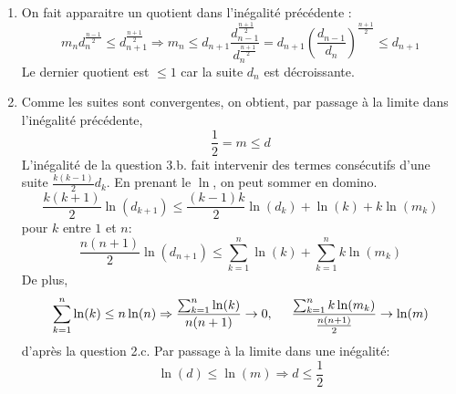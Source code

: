 \begin{enumerate}
\begin{enumerate}
\item On fait apparaitre un quotient dans l'inégalité précédente :
\begin{displaymath}
 m_n d_n^{\frac{n-1}{2}}\leq d_{n+1}^{\frac{n+1}{2}}
\Rightarrow m_n \leq d_{n+1}\frac{d_{n-1}^{\frac{n+1}{2}}}{d_{n}^{\frac{n+1}{2}}}
= d_{n+1}\left(\frac{d_{n-1}}{d_n} \right)^{\frac{n+1}{2}} \leq d_{n+1}
\end{displaymath}
Le dernier quotient est $\leq 1$ car la suite $d_n$ est décroissante. 
\item Comme les suites sont convergentes, on  obtient, par passage à la limite dans l'inégalité précédente,
\begin{displaymath}
 \frac{1}{2}=m\leq d
\end{displaymath}
L'inégalité de la question 3.b. fait intervenir des termes consécutifs d'une suite $\frac{k(k-1)}{2}d_k$. En prenant le $\ln$, on peut sommer en domino. 
\begin{displaymath}
 \frac{k(k+1)}{2} \ln(d_{k+1}) \leq \frac{(k-1)k}{2} \ln(d_{k}) + \ln(k) + k\ln(m_k) 
\end{displaymath}
pour $k$ entre $1$ et $n$:
\begin{displaymath}
  \frac{n(n+1)}{2}\ln(d_{n+1}) \leq  \sum_{k=1}^n\ln(k) + \sum_{k=1}^nk\ln(m_k)
\end{displaymath}
De plus,
\begin{displaymath}
  \sum_{k=1}^n\ln(k) \leq n\ln(n) \Rightarrow \frac{\sum_{k=1}^n\ln(k)}{n(n+1)} \rightarrow 0, \hspace{0.5cm}
    \frac{\sum_{k=1}^nk\ln(m_k)}{\frac{n(n+1)}{2}} \rightarrow \ln(m)
\end{displaymath}
d'après la question 2.c. Par passage à la limite dans une inégalité:
\begin{displaymath}
  \ln(d) \leq \ln(m)\Rightarrow d \leq \frac{1}{2}
\end{displaymath}

\end{enumerate}
\end{enumerate}
